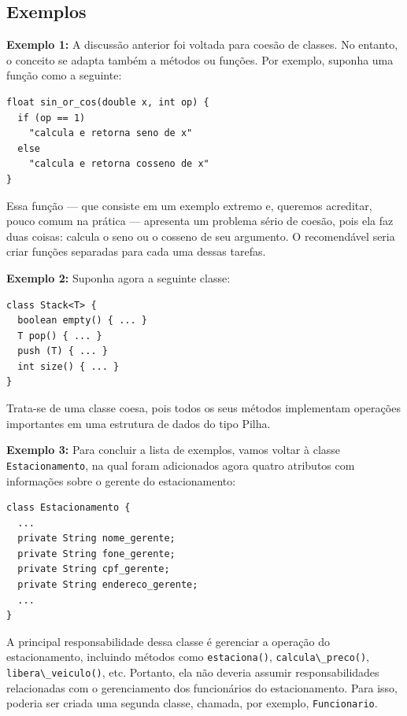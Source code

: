 \documentclass[
  11pt,
  twoside]{book}
\newcommand{\passthrough}[1]{#1}
\begin{document}
\hypertarget{exemplos}{%
\subsection{Exemplos}\label{exemplos}}

\textbf{Exemplo 1:} A discussão anterior foi voltada para coesão de
classes. No entanto, o conceito se adapta também a métodos ou funções.
Por exemplo, suponha uma função como a seguinte:

\begin{lstlisting}
float sin_or_cos(double x, int op) {
  if (op == 1)
    "calcula e retorna seno de x"
  else
    "calcula e retorna cosseno de x"
}
\end{lstlisting}

Essa função --- que consiste em um exemplo extremo e, queremos
acreditar, pouco comum na prática --- apresenta um problema sério de
coesão, pois ela faz duas coisas: calcula o seno ou o cosseno de seu
argumento. O recomendável seria criar funções separadas para cada uma
dessas tarefas.

\textbf{Exemplo 2:} Suponha agora a seguinte classe:

\begin{lstlisting}
class Stack<T> {
  boolean empty() { ... }
  T pop() { ... }
  push (T) { ... }
  int size() { ... }
}
\end{lstlisting}

Trata-se de uma classe coesa, pois todos os seus métodos implementam
operações importantes em uma estrutura de dados do tipo Pilha.

\textbf{Exemplo 3:} Para concluir a lista de exemplos, vamos voltar à
classe \passthrough{\lstinline!Estacionamento!}, na qual foram
adicionados agora quatro atributos com informações sobre o gerente do
estacionamento:

\begin{lstlisting}
class Estacionamento {
  ...
  private String nome_gerente;
  private String fone_gerente;
  private String cpf_gerente;
  private String endereco_gerente;
  ...
}  
\end{lstlisting}

A principal responsabilidade dessa classe é gerenciar a operação do
estacionamento, incluindo métodos como
\passthrough{\lstinline!estaciona()!},
\passthrough{\lstinline!calcula\_preco()!},
\passthrough{\lstinline!libera\_veiculo()!}, etc. Portanto, ela não
deveria assumir responsabilidades relacionadas com o gerenciamento dos
funcionários do estacionamento. Para isso, poderia ser criada uma
segunda classe, chamada, por exemplo,
\passthrough{\lstinline!Funcionario!}.
\end{document}
